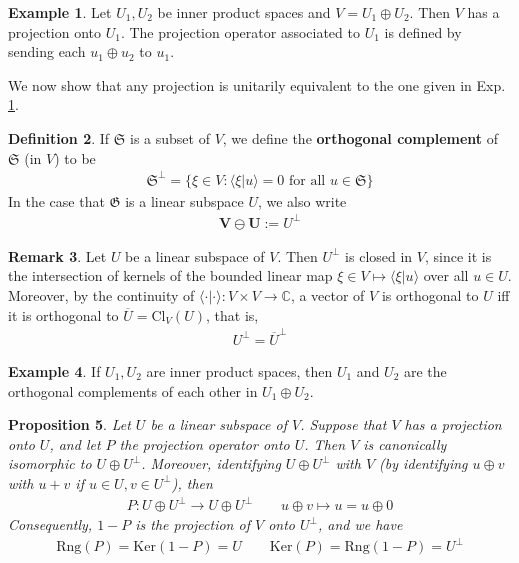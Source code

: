 \documentclass[12pt,b5paper,notitlepage]{article}
\theoremstyle{definition}
\newtheorem{df}{Definition}[subsection]
\newtheorem{eg}[df]{Example}
\newtheorem{rem}[df]{Remark}
\theoremstyle{plain}
\newtheorem{pp}[df]{Proposition}
\newcommand{\fk}{\mathfrak}
\newcommand{\ovl}{\overline}
\newcommand{\bk}[1]{\langle {#1}\rangle}
\newcommand{\Cbb}{\mathbb C}
\newcommand{\Ker}{\mathrm{Ker}}
\newcommand{\Rng}{\mathrm{Rng}}
\newcommand{\Cl}{\mathrm{Cl}}
\numberwithin{equation}{section}
\begin{document}
\begin{eg}\label{lb145}
Let $U_1,U_2$ be inner product spaces and $V=U_1\oplus U_2$. Then $V$ has a projection onto $U_1$. The projection operator associated to $U_1$ is defined by sending each $u_1\oplus u_2$ to $u_1$.
\end{eg}


We now show that any projection is unitarily equivalent to the one given in Exp. \ref{lb145}.

\begin{df}
If $\fk S$ is a subset of $V$, we define the \textbf{orthogonal complement}  of $\fk S$ (in $V$) to be \index{S@$\fk S^\perp$}
\begin{align*}
\pmb{\fk S^\perp}=\{\xi\in V:\bk{\xi|u}=0\text{ for all }u\in \fk S\}
\end{align*}
In the case that $\fk G$ is a linear subspace $U$, we also write 
\begin{align*}
\pmb{V\ominus U}:=U^\perp
\end{align*}
\end{df}

\begin{rem}\label{lb150}
Let $U$ be a linear subspace of $V$. Then $U^\perp$ is closed in $V$, since it is the intersection of kernels of the bounded linear map $\xi\in V\mapsto\bk{\xi|u}$ over all $u\in U$. Moreover, by the continuity of $\bk{\cdot|\cdot}:V\times V\rightarrow\Cbb$, a vector of $V$ is orthogonal to $U$ iff it is orthogonal to $\ovl U=\Cl_V(U)$, that is,
\begin{align*}
U^\perp=\ovl U^\perp
\end{align*}
\end{rem}



\begin{eg}
If $U_1,U_2$ are inner product spaces, then $U_1$ and $U_2$ are the orthogonal complements of each other in $U_1\oplus U_2$. 
\end{eg}

\begin{pp}\label{lb146}
Let $U$ be a linear subspace of $V$. Suppose that $V$ has a projection onto $U$, and let $P$ the projection operator onto $U$. Then $V$ is canonically isomorphic to $U\oplus U^\perp$. Moreover, identifying $U\oplus U^\perp$ with $V$ (by identifying $u\oplus v$ with $u+v$ if $u\in U,v\in U^\perp$), then
\begin{align*}
P:U\oplus U^\perp\rightarrow U\oplus U^\perp\qquad u\oplus v\mapsto u=u\oplus 0
\end{align*}
Consequently, $1-P$ is the projection of $V$ onto $U^\perp$, and we have 
\begin{align}\label{eq140}
\Rng(P)=\Ker(1-P)=U\qquad \Ker(P)=\Rng(1-P)=U^\perp
\end{align}
\end{pp}
\end{document}

